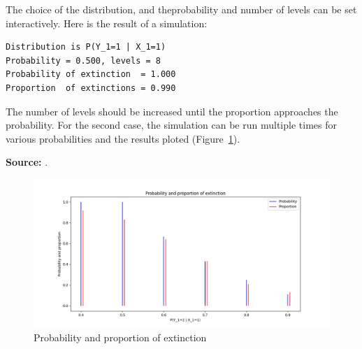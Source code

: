 \documentclass[11pt,a4paper]{article}
\begin{document}
The choice of the distribution, and theprobability and number of levels can be set interactively. Here is the result of a simulation:
\begin{verbatim}
Distribution is P(Y_1=1 | X_1=1)
Probability = 0.500, levels = 8
Probability of extinction  = 1.000
Proportion  of extinctions = 0.990
\end{verbatim}
The number of levels should be increased until the proportion approaches the probability. For the second case, the simulation can be run multiple times for various probabilities and the results ploted (Figure~\ref{f.extinction-01}).

\textbf{Source:} \cite[Section 8.3]{privault}.

\begin{figure}
\begin{center}
\includegraphics[width=\textwidth]{extinction-01}
\caption{Probability and proportion of extinction}\label{f.extinction-01}
\end{center}
\end{figure}

\newpage





\end{document}
